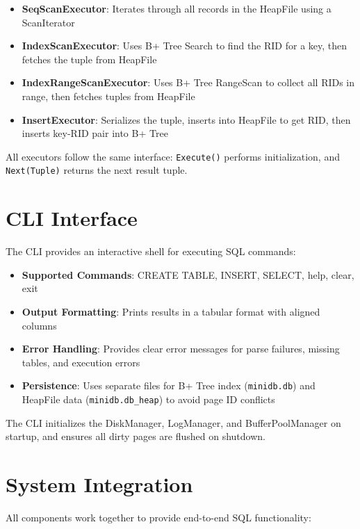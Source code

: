 \documentclass{article}
\begin{document}
\begin{itemize}
    \item \textbf{SeqScanExecutor}: Iterates through all records in the HeapFile using a ScanIterator
    \item \textbf{IndexScanExecutor}: Uses B+ Tree Search to find the RID for a key, then fetches the tuple from HeapFile
    \item \textbf{IndexRangeScanExecutor}: Uses B+ Tree RangeScan to collect all RIDs in range, then fetches tuples from HeapFile
    \item \textbf{InsertExecutor}: Serializes the tuple, inserts into HeapFile to get RID, then inserts key-RID pair into B+ Tree
\end{itemize}

All executors follow the same interface: \texttt{Execute()} performs initialization, and \texttt{Next(Tuple)} returns the next result tuple.

\section{CLI Interface}

The CLI provides an interactive shell for executing SQL commands:

\begin{itemize}
    \item \textbf{Supported Commands}: CREATE TABLE, INSERT, SELECT, help, clear, exit
    \item \textbf{Output Formatting}: Prints results in a tabular format with aligned columns
    \item \textbf{Error Handling}: Provides clear error messages for parse failures, missing tables, and execution errors
    \item \textbf{Persistence}: Uses separate files for B+ Tree index (\texttt{minidb.db}) and HeapFile data (\texttt{minidb.db\_heap}) to avoid page ID conflicts
\end{itemize}

The CLI initializes the DiskManager, LogManager, and BufferPoolManager on startup, and ensures all dirty pages are flushed on shutdown.

\section{System Integration}

All components work together to provide end-to-end SQL functionality:
\end{document}
